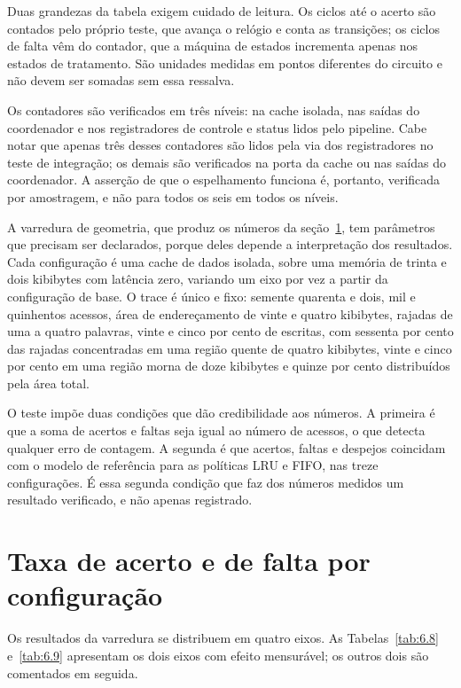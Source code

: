 Duas grandezas da tabela exigem cuidado de leitura. Os ciclos até o acerto são contados pelo próprio teste, que avança o relógio e conta as transições; os ciclos de falta vêm do contador, que a máquina de estados incrementa apenas nos estados de tratamento. São unidades medidas em pontos diferentes do circuito e não devem ser somadas sem essa ressalva.

Os contadores são verificados em três níveis: na cache isolada, nas saídas do coordenador e nos registradores de controle e status lidos pelo pipeline. Cabe notar que apenas três desses contadores são lidos pela via dos registradores no teste de integração; os demais são verificados na porta da cache ou nas saídas do coordenador. A asserção de que o espelhamento funciona é, portanto, verificada por amostragem, e não para todos os seis em todos os níveis.

A varredura de geometria, que produz os números da seção~\ref{sec:6.6}, tem parâmetros que precisam ser declarados, porque deles depende a interpretação dos resultados. Cada configuração é uma cache de dados isolada, sobre uma memória de trinta e dois kibibytes com latência zero, variando um eixo por vez a partir da configuração de base. O trace é único e fixo: semente quarenta e dois, mil e quinhentos acessos, área de endereçamento de vinte e quatro kibibytes, rajadas de uma a quatro palavras, vinte e cinco por cento de escritas, com sessenta por cento das rajadas concentradas em uma região quente de quatro kibibytes, vinte e cinco por cento em uma região morna de doze kibibytes e quinze por cento distribuídos pela área total.

O teste impõe duas condições que dão credibilidade aos números. A primeira é que a soma de acertos e faltas seja igual ao número de acessos, o que detecta qualquer erro de contagem. A segunda é que acertos, faltas e despejos coincidam com o modelo de referência para as políticas LRU e FIFO, nas treze configurações. É essa segunda condição que faz dos números medidos um resultado verificado, e não apenas registrado.

\section{Taxa de acerto e de falta por configuração}\label{sec:6.6}

Os resultados da varredura se distribuem em quatro eixos. As Tabelas~\ref{tab:6.8} e~\ref{tab:6.9} apresentam os dois eixos com efeito mensurável; os outros dois são comentados em seguida.

